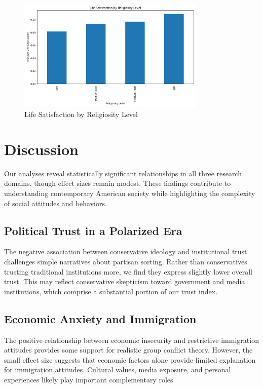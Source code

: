\documentclass[12pt,a4paper]{article}
\begin{document}
\begin{figure}[h]
\centering
\includegraphics[width=0.8\textwidth]{research3_religion_wellbeing.png}
\caption{Life Satisfaction by Religiosity Level}
\end{figure}

\section{Discussion}

Our analyses reveal statistically significant relationships in all three research 
domains, though effect sizes remain modest. These findings contribute to 
understanding contemporary American society while highlighting the complexity of 
social attitudes and behaviors.

\subsection{Political Trust in a Polarized Era}

The negative association between conservative ideology and institutional trust 
challenges simple narratives about partisan sorting. Rather than conservatives 
trusting traditional institutions more, we find they express slightly lower overall 
trust. This may reflect conservative skepticism toward government and media 
institutions, which comprise a substantial portion of our trust index.

\subsection{Economic Anxiety and Immigration}

The positive relationship between economic insecurity and restrictive immigration 
attitudes provides some support for realistic group conflict theory. However, the 
small effect size suggests that economic factors alone provide limited explanation 
for immigration attitudes. Cultural values, media exposure, and personal experiences 
likely play important complementary roles.
\end{document}

